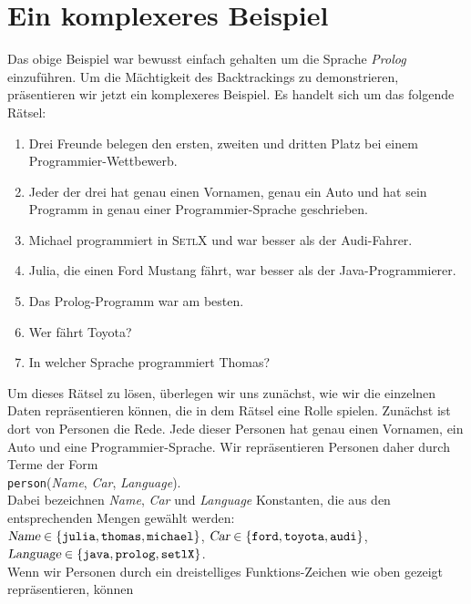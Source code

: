 \section{Ein komplexeres Beispiel}
Das obige Beispiel war bewusst einfach gehalten um die Sprache \textsl{Prolog} einzuf\"{u}hren.
Um die M\"{a}chtigkeit des Backtrackings zu demonstrieren, pr\"{a}sentieren wir jetzt ein
komplexeres Beispiel.  Es handelt sich um das folgende R\"{a}tsel:
\begin{enumerate}
\item Drei Freunde belegen den ersten, zweiten und dritten Platz bei einem
      Programmier-Wettbewerb.
\item Jeder der drei hat genau einen Vornamen, genau ein Auto und hat sein Programm
      in genau einer Programmier-Sprache geschrieben.
\item Michael programmiert in \textsc{SetlX} und war besser als der Audi-Fahrer.
\item Julia, die einen Ford Mustang f\"{a}hrt, war besser als der Java-Programmierer.
\item Das Prolog-Programm war am besten.
\item Wer f\"{a}hrt Toyota?
\item In welcher Sprache programmiert Thomas?
\end{enumerate}
Um dieses R\"{a}tsel zu l\"{o}sen, \"{u}berlegen wir uns zun\"{a}chst, wie wir die einzelnen Daten
repr\"{a}sentieren k\"{o}nnen, die in dem R\"{a}tsel eine Rolle spielen.  Zun\"{a}chst ist dort von
Personen die Rede. Jede dieser Personen hat genau einen Vornamen, ein Auto und eine
Programmier-Sprache.   Wir repr\"{a}sentieren Personen daher durch Terme der Form \\[0.2cm]
\hspace*{1.3cm} \texttt{person}(\textsl{Name}, \textsl{Car}, \textsl{Language}). \\[0.2cm]
Dabei bezeichnen \textsl{Name}, \textsl{Car} und \textsl{Language} Konstanten, die aus den
entsprechenden Mengen gew\"{a}hlt werden:
\\[0.2cm]
\hspace*{1.3cm} 
$\textsl{Name} \in \{ \texttt{julia}, \texttt{thomas}, \texttt{michael} \}$, \quad
$\textsl{Car} \in \{ \texttt{ford}, \texttt{toyota}, \texttt{audi} \}$, \\[0.2cm]
\hspace*{1.3cm} 
$\textsl{Language} \in \{ \texttt{java}, \texttt{prolog}, \texttt{setlX} \}$. \\[0.2cm]
Wenn wir Personen durch ein dreistelliges Funktions-Zeichen wie oben gezeigt repr\"{a}sentieren, k\"{o}nnen
